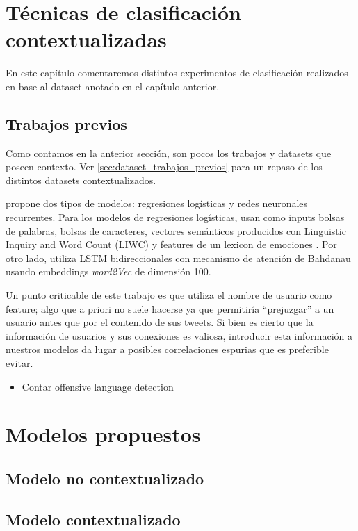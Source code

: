\section{Técnicas de clasificación contextualizadas}
En este capítulo comentaremos distintos experimentos de clasificación realizados en base al dataset anotado en el capítulo anterior.


\subsection{Trabajos previos}

Como contamos en la anterior sección, son pocos los trabajos y datasets que poseen contexto. Ver \ref{sec:dataset_trabajos_previos} para un repaso de los distintos datasets contextualizados.

\citet{gao2018detecting} propone dos tipos de modelos: regresiones logísticas y redes neuronales recurrentes. Para los modelos de regresiones logísticas, usan como inputs bolsas de palabras, bolsas de caracteres, vectores semánticos producidos con Linguistic Inquiry and Word Count (LIWC) \cite{pennebaker2001linguistic} y features de un lexicon de emociones \cite{mohammad2013nrc}. Por otro lado, utiliza LSTM bidireccionales con mecanismo de atención de Bahdanau \cite{bahdanau2014neural} usando embeddings \emph{word2Vec} de dimensión 100.

Un punto criticable de este trabajo es que utiliza el nombre de usuario como feature; algo que a priori no suele hacerse ya que permitiría ``prejuzgar'' a un usuario antes que por el contenido de sus tweets. Si bien es cierto que la información de usuarios y sus conexiones es valiosa, introducir esta información a nuestros modelos da lugar a posibles correlaciones espurias que es preferible evitar.

\begin{itemize}
    \item Contar offensive language detection
\end{itemize}

\section{Modelos propuestos}

\subsection{Modelo no contextualizado}
\subsection{Modelo contextualizado}

